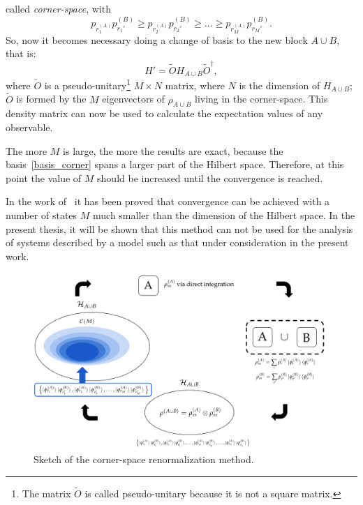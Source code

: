 called \emph{corner-space}, with
\begin{equation*}
    p_r_1^{(A)}p_{r_1'}^{(B)} \geq p_r_2^{(A)}p_{r_2'}^{(B)} \geq \dots \geq p_r_M^{(A)}p_{r_M'}^{(B)}.
\end{equation*}
So, now it becomes necessary doing a change of basis to the new block $A \cup B$, that is:
\begin{equation}
    H' = \widetilde{O} H_{A\cup B} \widetilde{O}^\dagger,
\end{equation}
where $\widetilde{O}$ is a pseudo-unitary\footnote{The matrix $\widetilde{O}$ is called pseudo-unitary because it is not a square matrix.} $M\times N$ matrix, where $N$ is the dimension of $H_{A\cup B}$; $\widetilde{O}$ is formed by the $M$ eigenvectors of $\rho_{A\cup B}$ living in the corner-space. This density matrix can now be used to calculate the expectation values of any observable.

The more $M$ is large, the more the results are exact, because the basis~\ref{basis_corner} spans a larger part of the Hilbert space. Therefore, at this point the value of $M$ should be increased until the convergence is reached.

In the work of~\cite{PhysRevLett.115.080604} it has been proved that convergence can be achieved with a number of states $M$ much smaller than the dimension of the Hilbert space. In the present thesis, it will be shown that this method can not be used for the analysis of systems described by a model such as that under consideration in the present work.


\begin{figure}
    \centering
    \includegraphics[scale=0.55]{Figures/csr_sketch}
    \captionsetup{width=1.\linewidth}
    \caption{Sketch of the corner-space renormalization method.}
    \label{fig:csr_sketch}
\end{figure}

